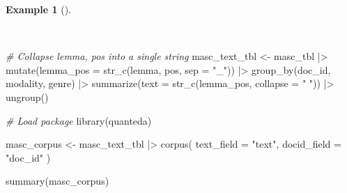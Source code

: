 \documentclass[
  letterpaper,
  DIV=11,
  numbers=noendperiod]{scrreport}
\newenvironment{Shaded}{\begin{snugshade}}{\end{snugshade}}
\newcommand{\AttributeTok}[1]{\textcolor[rgb]{0.00,0.00,0.00}{#1}}
\newcommand{\CommentTok}[1]{\textcolor[rgb]{0.00,0.00,0.00}{\textit{#1}}}
\newcommand{\FunctionTok}[1]{\textcolor[rgb]{0.00,0.00,0.00}{#1}}
\newcommand{\NormalTok}[1]{\textcolor[rgb]{0.00,0.00,0.00}{#1}}
\newcommand{\OtherTok}[1]{\textcolor[rgb]{0.00,0.00,0.00}{#1}}
\newcommand{\SpecialCharTok}[1]{\textcolor[rgb]{0.00,0.00,0.00}{#1}}
\newcommand{\StringTok}[1]{\textcolor[rgb]{0.00,0.00,0.00}{#1}}
\theoremstyle{definition}
\newtheorem{example}{Example}[chapter]
\theoremstyle{remark}
\begin{document}
\begin{example}[]\protect\hypertarget{exm-eda-masc-kwic}{}\label{exm-eda-masc-kwic}

~

\begin{Shaded}
\begin{Highlighting}[]
\CommentTok{\# Collapse lemma, pos into a single string}
\NormalTok{masc\_text\_tbl }\OtherTok{\textless{}{-}} 
\NormalTok{  masc\_tbl }\SpecialCharTok{|\textgreater{}} 
  \FunctionTok{mutate}\NormalTok{(}\AttributeTok{lemma\_pos =} \FunctionTok{str\_c}\NormalTok{(lemma, pos, }\AttributeTok{sep =} \StringTok{"\_"}\NormalTok{)) }\SpecialCharTok{|\textgreater{}}
  \FunctionTok{group\_by}\NormalTok{(doc\_id, modality, genre) }\SpecialCharTok{|\textgreater{}} 
  \FunctionTok{summarize}\NormalTok{(}\AttributeTok{text =} \FunctionTok{str\_c}\NormalTok{(lemma\_pos, }\AttributeTok{collapse =} \StringTok{" "}\NormalTok{)) }\SpecialCharTok{|\textgreater{}} 
  \FunctionTok{ungroup}\NormalTok{()}

\CommentTok{\# Load package}
\FunctionTok{library}\NormalTok{(quanteda)}

\NormalTok{masc\_corpus }\OtherTok{\textless{}{-}} 
\NormalTok{  masc\_text\_tbl }\SpecialCharTok{|\textgreater{}} 
  \FunctionTok{corpus}\NormalTok{(}
    \AttributeTok{text\_field =} \StringTok{"text"}\NormalTok{,}
    \AttributeTok{docid\_field =} \StringTok{"doc\_id"}
\NormalTok{  )}

\FunctionTok{summary}\NormalTok{(masc\_corpus)}
\end{Highlighting}
\end{Shaded}


\end{example}
\end{document}
